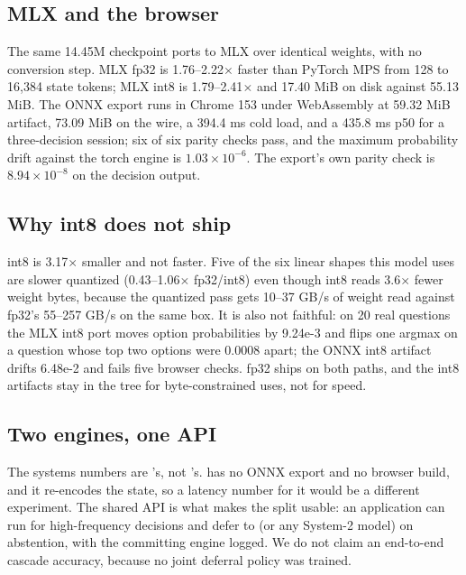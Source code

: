 \subsection{MLX and the browser}
The same 14.45M checkpoint ports to MLX over identical weights, with no conversion step. MLX fp32 is 1.76--2.22$\times$ faster than PyTorch MPS from 128 to 16{,}384 state tokens; MLX int8 is 1.79--2.41$\times$ and 17.40 MiB on disk against 55.13 MiB. The ONNX export runs in Chrome 153 under WebAssembly at 59.32 MiB artifact, 73.09 MiB on the wire, a 394.4 ms cold load, and a 435.8 ms p50 for a three-decision session; six of six parity checks pass, and the maximum probability drift against the torch engine is $1.03\times10^{-6}$. The export's own parity check is $8.94\times10^{-8}$ on the decision output.

\subsection{Why int8 does not ship}
int8 is 3.17$\times$ smaller and not faster. Five of the six linear shapes this model uses are slower quantized (0.43--1.06$\times$ fp32/int8) even though int8 reads 3.6$\times$ fewer weight bytes, because the quantized pass gets 10--37 GB/s of weight read against fp32's 55--257 GB/s on the same box. It is also not faithful: on 20 real questions the MLX int8 port moves option probabilities by 9.24e-3 and flips one argmax on a question whose top two options were 0.0008 apart; the ONNX int8 artifact drifts 6.48e-2 and fails five browser checks. fp32 ships on both paths, and the int8 artifacts stay in the tree for byte-constrained uses, not for speed.

\subsection{Two engines, one API}
The systems numbers are \stream{}'s, not \vsix{}'s. \vsix{} has no ONNX export and no browser build, and it re-encodes the state, so a latency number for it would be a different experiment. The shared API is what makes the split usable: an application can run \stream{} for high-frequency decisions and defer to \vsix{} (or any System-2 model) on abstention, with the committing engine logged. We do not claim an end-to-end cascade accuracy, because no joint deferral policy was trained.

